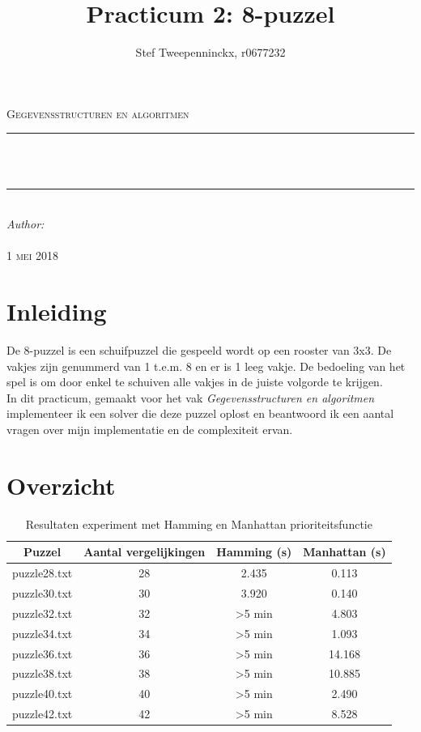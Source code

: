 \documentclass[11pt, a4paper]{article}
\author{Stef Tweepenninckx, r0677232}
\title{Practicum 2: 8-puzzel}
\makeatletter
\def\printtitle{                 
    {\large \@title}}
\def\printauthor{                  
    {\large \@author}}
\makeatother
\begin{document}
\begin{titlepage}
\newcommand{\HRule}{\rule{\linewidth}{0.5mm}} 
\center 
\textsc{\LARGE Gegevensstructuren en algoritmen}\\[1.5cm] 
\HRule \\[0.4cm]

{\huge \bfseries \printtitle}\\[0.4cm] 
\HRule \\[0.4cm]

\Large \emph{Author:}\\
 \textsc{\printauthor}\\[3cm]

{\large \textsc{1 mei 2018}}\\[3cm] 

\vfill 
\end{titlepage}

\section*{Inleiding}
De 8-puzzel is een schuifpuzzel die gespeeld wordt op een rooster van 3x3. De vakjes zijn genummerd van 1 t.e.m. 8 en er is 1 leeg vakje. De bedoeling van het spel is om door enkel te schuiven alle vakjes in de juiste volgorde te krijgen.\\
In dit practicum, gemaakt voor het vak \emph{Gegevensstructuren en algoritmen} implementeer ik een solver die deze puzzel oplost en beantwoord ik een aantal vragen over mijn implementatie en de complexiteit ervan.

\newpage
\section*{Overzicht}
\begin{table}[ht]
\centering
\label{my-label}
\begin{tabular}{|cccc|}
\hline
Puzzel       & Aantal vergelijkingen & Hamming (s)        & Manhattan (s) \\ \hline
puzzle28.txt & 28                    & 2.435              & 0.113         \\
puzzle30.txt & 30                    & 3.920              & 0.140         \\
puzzle32.txt & 32                    & \textgreater 5 min & 4.803         \\
puzzle34.txt & 34                    & \textgreater 5 min & 1.093         \\
puzzle36.txt & 36                    & \textgreater 5 min & 14.168        \\
puzzle38.txt & 38                    & \textgreater 5 min & 10.885        \\
puzzle40.txt & 40                    & \textgreater 5 min & 2.490         \\
puzzle42.txt & 42                    & \textgreater 5 min & 8.528         \\ \hline
\end{tabular}
\captionsetup{justification=centering,margin=2cm}
\caption{Resultaten experiment met Hamming en Manhattan prioriteitsfunctie}
\end{table}
\end{document}
